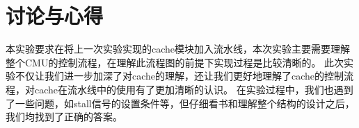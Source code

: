 \section{讨论与心得}
本实验要求在将上一次实验实现的cache模块加入流水线，本次实验主要需要理解整个CMU的控制流程，在理解此流程图的前提下实现过程是比较清晰的。
此次实验不仅让我们进一步加深了对cache的理解，还让我们更好地理解了cache的控制流程，对cache在流水线中的使用有了更加清晰的认识。
在实验过程中，我们也遇到了一些问题，如stall信号的设置条件等，但仔细看书和理解整个结构的设计之后，我们均找到了正确的答案。